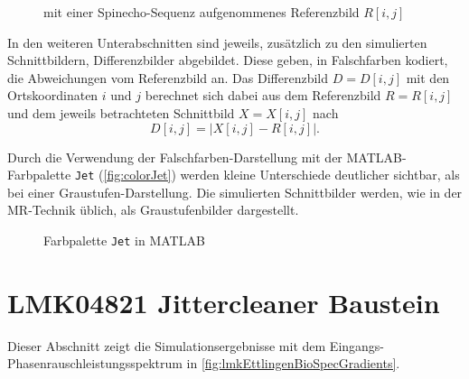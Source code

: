 \begin{figure}[H]
	\centering
	\caption[Referenzbild]{mit einer Spinecho-Sequenz aufgenommenes Referenzbild $R[i,j]$}
	\label{fig:R}
\end{figure}

In den weiteren Unterabschnitten sind jeweils, zusätzlich zu den simulierten Schnittbildern, Differenzbilder abgebildet. Diese geben, in Falschfarben kodiert, die Abweichungen vom Referenzbild an. Das Differenzbild $D=D[i,j]$ mit den Ortskoordinaten $i$ und $j$ berechnet sich dabei aus dem Referenzbild $R=R[i,j]$ und dem jeweils betrachteten Schnittbild $X=X[i,j]$ nach
\begin{equation}
	D[i,j]=\left| X[i,j]-R[i,j]\right|.
\end{equation}

Durch die Verwendung der Falschfarben-Darstellung mit der MATLAB-Farbpalette \texttt{Jet} (\autoref{fig:colorJet}) werden kleine Unterschiede deutlicher sichtbar, als bei einer Graustufen-Darstellung. Die simulierten Schnittbilder werden, wie in der MR-Technik üblich, als Graustufenbilder dargestellt.

\begin{figure}[H]
	\centering
	\caption[]{Farbpalette \texttt{Jet} in MATLAB}
	\label{fig:colorJet}
\end{figure}






\clearpage
\section{LMK04821 Jittercleaner Baustein}
Dieser Abschnitt zeigt die Simulationsergebnisse mit dem Eingangs-Phasen\-rausch\-leistungs\-spektrum in \autoref{fig:lmkEttlingenBioSpecGradients}.

